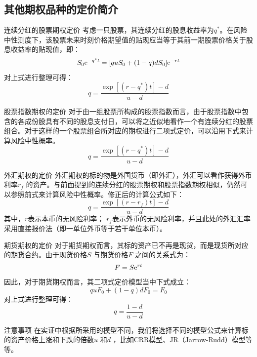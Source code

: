 \documentclass[t]{beamer}
\begin{document}
\subsection{其他期权品种的定价简介}
\begin{frame}{连续分红的股票期权定价}
	考虑一只股票，其连续分红的股息收益率为$q^*$。在风险中性测度下，该股票未来时刻价格期望值的贴现应当等于其前一期股票价格关于股息收益率的贴现值，即：
\[{S_0}{{\rm e}^{ - {q^*}t}} = [qu{S_0} + (1 - q)d{S_0}]{{\rm e}^{ - rt}}\]
对上式进行整理可得：
\begin{equation*}
q = \frac{{\exp \left[ {(r - {q^*})t} \right] - d}}{{u - d}}
\end{equation*}
\end{frame}

\begin{frame}{股票指数期权的定价}
	对于由一组股票所构成的股票指数而言，由于股票指数中包含的各成份股具有不同的股息支付日，可以将之近似地看作一个有连续分红的股票组合。对于这样的一个股票组合所对应的期权进行二项式定价，可以沿用下式来计算风险中性概率。
	\begin{equation*}
		q = \frac{{\exp \left[ {(r - {q^*})t} \right] - d}}{{u - d}}
		\end{equation*}
\end{frame}

\begin{frame}{外汇期权的定价}
	外汇期权的标的物是外国货币（即外汇），外汇可以看作获得外币利率$r_f$ 的资产。与前面提到的连续分红的股票期权和股票指数期权相似，仍然可以参照前式来计算风险中性概率。修正后的计算公式如下：
\begin{equation*}
q = \frac{{\exp \left[ {(r - {r_f})t} \right] - d}}{{u - d}}
\end{equation*}
其中，$r$表示本币的无风险利率； $r_f$表示外币的无风险利率，并且此处的外汇汇率采用直接报价法（即一单位外币等于若干单位本币）。
\end{frame}

\begin{frame}{期货期权的定价}
	对于期货期权而言，其标的资产已不再是现货，而是现货所对应的期货合约。由于现货价格$S$ 与期货价格$F$ 之间的关系式为：
\[F=S{\rm e}^{rt} \]
因此，对于期货期权而言，其二项式定价模型当中下式成立：
\[quF_0+(1-q)dF_0=F_0 \]
对上式进行整理可得：
\begin{equation*}
q=\frac{1-d}{u-d}
\end{equation*}
\end{frame}

\begin{frame}{注意事项}
	在实证中根据所采用的模型不同，我们将选择不同的模型公式来计算标的资产价格上涨和下跌的倍数$u$ 和$d$ ，比如CRR模型、JR（Jarrow-Rudd）模型等等。
\end{frame}
\end{document}

